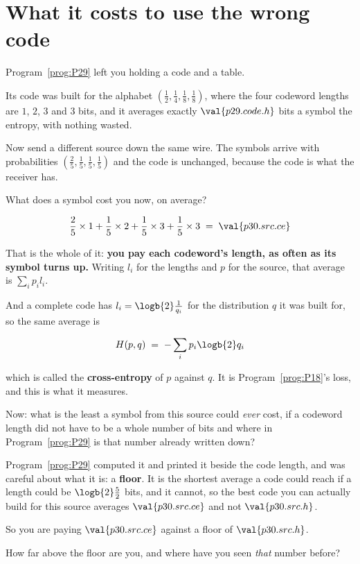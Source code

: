 \section{What it costs to use the wrong code}
\label{sec:P30-cost}

\begin{fr}
Program~\ref{prog:P29} left you holding a code and a table.

Its code was built for the alphabet $(\frac12, \frac14, \frac18, \frac18)$,
where the four codeword lengths are $1$, $2$, $3$ and $3$ bits, and it
averages exactly $\val{p29.code.h}$ bits a symbol \dash{} the entropy, with
nothing wasted.

Now send a different source down the same wire. The symbols arrive with
probabilities $(\frac25, \frac15, \frac15, \frac15)$ and the code is
unchanged, because the code is what the receiver has.

What does a symbol cost you now, on average?
\dotline
\nextframe
\end{fr}

\begin{fr}

\[ \frac25 \times 1 + \frac15 \times 2 + \frac15 \times 3
   + \frac15 \times 3 \;=\; \val{p30.src.ce} \]

That is the whole of it: \textbf{you pay each codeword's length, as often as its
symbol turns up.} Writing $l_i$ for the lengths and $p$ for the source,
that average is $\sum_i p_i l_i$.

And a complete code has $l_i = \logb{2}\frac{1}{q_i}$ for the distribution
$q$ it was built for, so the same average is

\[ H(p, q) \;=\; -\sum_i p_i \logb{2} q_i \]

which is called the \textbf{cross-entropy} of $p$ against $q$. It is
Program~\ref{prog:P18}'s loss, and this is what it measures.

Now: what is the least a symbol from this source could \emph{ever} cost, if
a codeword length did not have to be a whole number of bits \dash{} and
where in Program~\ref{prog:P29} is that number already written down?
\dotline
\nextframe
\end{fr}

\begin{fr}

Program~\ref{prog:P29} computed it and printed it beside the code length, and
was careful about what it is: a \textbf{floor}. It is the shortest average a
code could reach if a length could be $\logb{2}\frac{5}{2}$ bits, and it
cannot, so the best code you can actually build for this source averages
$\val{p30.src.ce}$ and not $\val{p30.src.h}$.

So you are paying $\val{p30.src.ce}$ against a floor of $\val{p30.src.h}$.

How far above the floor are you, and where have you seen \emph{that} number
before?
\dotline
\nextframe
\end{fr}

